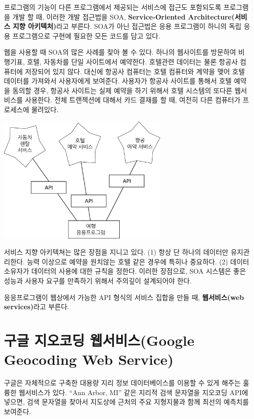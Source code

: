 프로그램의 기능이 다른 프로그램에서 제공되는 서비스에 접근도 포함되도록 프로그램을 개발 할 때,
이러한 개발 접근법을 SOA, {\bf Service-Oriented Architecture(서비스 지향 아키텍처)}라고 부른다.
SOA가 아닌 접근법은 응용 프로그램이 하니의 독립 응용 프로그램으로 구현에 필요한 모든 코드를 담고 있다.

웹을 사용할 때 SOA의 많은 사례를 찾아 볼 수 있다. 하나의 웹사이트를 방문하여 비행기표, 호텔, 자동차를 단일
사이트에서 예약한다. 호텔관련 데이터는 물론 항공사 컴퓨터에 저장되어 있지 않다.
대신에 항공사 컴퓨터는 호텔 컴퓨터와 계약을 맺어 호텔 데이터를 가져와서 사용자에게 보여준다.
사용자가 항공사 사이트를 통해서 호텔 예약을 동의할 경우, 항공사 사이트는 실제 예약을 하기 위해서
호텔 시스템의 또다른 웹서비스를 사용한다.
전체 트랜젝션에 대해서 카드 결재를 할 때, 여전히 다른 컴퓨터가 프로세스에 물려있다.

\beforefig
\centerline{\includegraphics[height=2.50in]{figs2/soa.eps}}
\afterfig

서비스 지향 아키텍쳐는 많은 장점을 지니고 있다. (1) 항상 단 하나의 데이터만 유지관리한다. 
능력 이상으로 예약을 원치않는 호텔  같은 경우에 특히나 중요하다. (2) 데이터 소유자가 
데이터의 사용에 대한 규칙을 정한다. 이러한 장점으로, SOA 시스템은 좋은 성능과 사용자 요구를 만족하기 위해서
주의깊이 설계되어야 한다. 

응응프로그램이 웹상에서 가능한 API 형식의 서비스 집합을 만들 때, {\bf 웹서비스(web services)}라고 부른다.

\section{구글 지오코딩 웹서비스(Google Geocoding Web Service)}

구글은 자체적으로 구축한 대용량 지리 정보 데이터베이스를 이용할 수 있게 해주는 훌륭한 웹서비스가 있다.
``Ann Arbor, MI'' 같은 지리적 검색 문자열을 지오코딩 API에 넣으면, 
검색 문자열을 찾아서 지도상에 근처의 주요 지형지물과 함께 최선의 예측치를 보여준다. 

